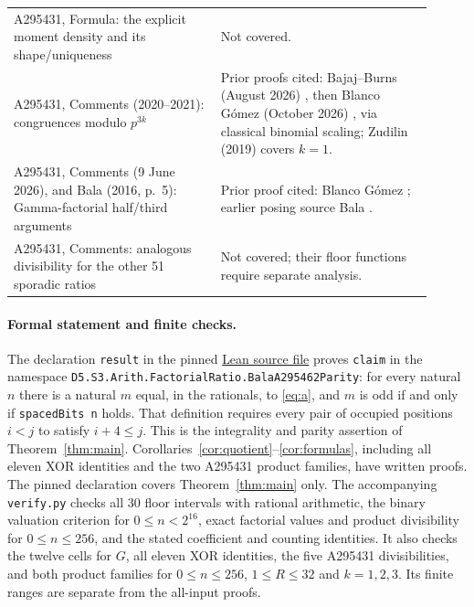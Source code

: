 \documentclass[11pt]{article}
\newcommand{\leanurl}{https://github.com/the-omega-institute/trureturing/blob/b95cdbb8cccca425964251ba38cc0b0e517e478a/D5/S3/Arith/FactorialRatio/BalaA295462Parity.lean}
\begin{document}
\begin{longtable}{p{0.45\linewidth}p{0.46\linewidth}}
A295431, Formula: the explicit moment density and its shape/uniqueness&Not covered.\\
A295431, Comments (2020--2021): congruences modulo $p^{3k}$&Prior proofs cited: Bajaj--Burns (August 2026) \cite{tower}, then Blanco G\'omez (October 2026) \cite[Corollary~1.4(d)]{blanco}, via classical binomial scaling; Zudilin (2019) \cite[Section~5]{zudilin} covers $k=1$.\\
A295431, Comments (9 June 2026), and Bala (2016, p.~5): Gamma-factorial half/third arguments&Prior proof cited: Blanco G\'omez \cite[Corollary~1.5]{blanco}; earlier posing source Bala \cite{bala2016}.\\
A295431, Comments: analogous divisibility for the other 51 sporadic ratios&Not covered; their floor functions require separate analysis.\\
\bottomrule
\end{longtable}
\endgroup

\paragraph{Formal statement and finite checks.}
The declaration \texttt{result} in the pinned
\href{\leanurl}{Lean source file}
proves \texttt{claim} in the namespace
\nolinkurl{D5.S3.Arith.FactorialRatio.BalaA295462Parity}:
for every natural $n$ there is a natural $m$ equal, in the rationals,
to \eqref{eq:a}, and $m$ is odd if and only if
\texttt{spacedBits n} holds. That definition requires every pair of
occupied positions $i<j$ to satisfy $i+4\leq j$.
This is the integrality and parity assertion of Theorem~\ref{thm:main}.
Corollaries~\ref{cor:quotient}--\ref{cor:formulas}, including all eleven XOR
identities and the two A295431 product families, have written proofs.
The pinned declaration covers Theorem~\ref{thm:main} only.
The accompanying \texttt{verify.py} checks all 30 floor
intervals with rational arithmetic, the binary valuation criterion for
$0\leq n<2^{16}$, exact factorial values and product divisibility for
$0\leq n\leq256$, and the stated coefficient and counting identities.
It also checks the twelve cells for $G$, all eleven XOR identities,
the five A295431 divisibilities, and both product families for
$0\leq n\leq256$, $1\leq R\leq32$ and $k=1,2,3$.
Its finite ranges are separate from the all-input proofs.
\end{document}
